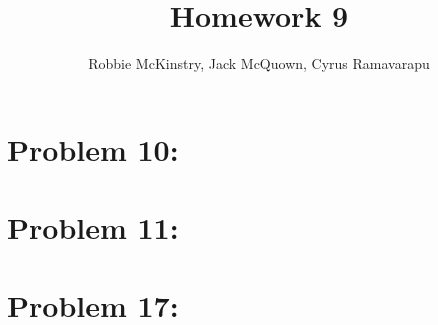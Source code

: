 \documentclass[12pt]{article}
\begin{document}
\title{Homework 9}
\author{Robbie McKinstry, Jack McQuown, Cyrus Ramavarapu}
\renewcommand{\today}{22 September 2016}
\renewcommand{\baselinestretch}{1.5}
\maketitle

\section*{Problem 10: }
\section*{Problem 11: }
\section*{Problem 17: }
\end{document}
